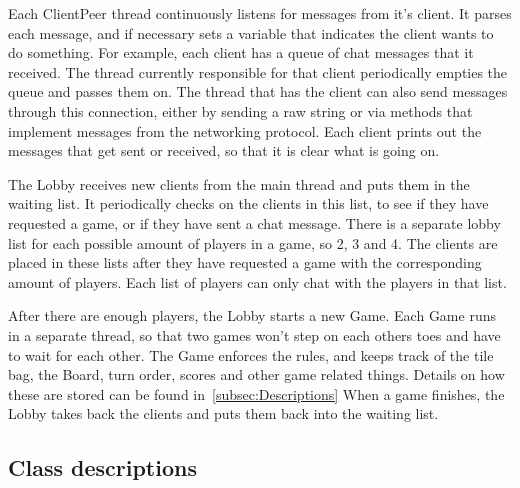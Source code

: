 \documentclass[12pt, letterpaper]{article}
\begin{document}
    Each ClientPeer thread continuously listens for messages from it's client.
    It parses each message, and if necessary sets a variable that indicates the client wants to do something.
    For example, each client has a queue of chat messages that it received.
    The thread currently responsible for that client periodically empties the queue and passes them on.
    The thread that has the client can also send messages through this connection, either by sending a raw string
    or via methods that implement messages from the networking protocol.
    Each client prints out the messages that get sent or received, so that it is clear what is going on.

    The Lobby receives new clients from the main thread and puts them in the waiting list.
    It periodically checks on the clients in this list, to see if they have requested a game, or if they have
    sent a chat message.
    There is a separate lobby list for each possible amount of players in a game, so 2, 3 and 4.
    The clients are placed in these lists after they have requested a game with the corresponding amount of players.
    Each list of players can only chat with the players in that list.

    After there are enough players, the Lobby starts a new Game.
    Each Game runs in a separate thread, so that two games won't step on each others toes
    and have to wait for each other.
    The Game enforces the rules, and keeps track of the tile bag, the Board, turn order, scores and other game
    related things.
    Details on how these are stored can be found in~\autoref{subsec:Descriptions}
    When a game finishes, the Lobby takes back the clients and puts them back into the waiting list.


    \subsection{Class descriptions}
    \label{subsec:Descriptions}


\end{document}
